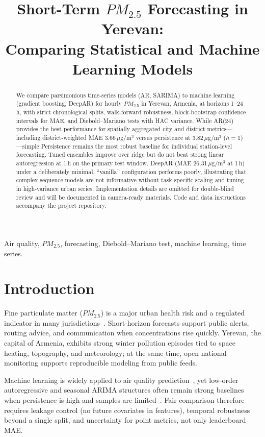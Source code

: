 \documentclass[conference]{IEEEtran}
\title{Short-Term $PM_{2.5}$ Forecasting in Yerevan:\\
Comparing Statistical and Machine Learning Models}
\author{%
\IEEEauthorblockN{Anonymous author(s)}%
\IEEEauthorblockA{%
\textit{Author identities withheld for double-blind review (ICDSG 2026)}%
}%
}
\author{%
\IEEEauthorblockN{Areg Khachatryan}%
\IEEEauthorblockA{%
American University of Armenia\\
Yerevan, Armenia}%
}
\begin{document}
\maketitle
\begin{abstract}
We compare parsimonious time-series models (AR, SARIMA) to machine learning (gradient boosting, DeepAR) for hourly $PM_{2.5}$ in Yerevan, Armenia, at horizons 1--24\,h, with strict chronological splits, walk-forward robustness, block-bootstrap confidence intervals for MAE, and Diebold--Mariano tests with HAC variance. While AR(24) provides the best performance for spatially aggregated city and district metrics---including district-weighted MAE 3.66\,$\mu$g/m$^3$ versus persistence at 3.82\,$\mu$g/m$^3$ ($h{=}1$)---simple Persistence remains the most robust baseline for individual station-level forecasting. Tuned ensembles improve over ridge but do not beat strong linear autoregression at 1\,h on the primary test window. DeepAR (MAE 26.31\,$\mu$g/m$^3$ at 1\,h) under a deliberately minimal, ``vanilla'' configuration performs poorly, illustrating that complex sequence models are not informative without task-specific scaling and tuning in high-variance urban series.
\ificdsgreview
Implementation details are omitted for double-blind review and will be documented in camera-ready materials.
\else
Code and data instructions accompany the project repository.
\fi
\end{abstract}

\begin{IEEEkeywords}
Air quality, $PM_{2.5}$, forecasting, Diebold--Mariano test, machine learning, time series.
\end{IEEEkeywords}

\section{Introduction}

Fine particulate matter ($PM_{2.5}$) is a major urban health risk and a regulated indicator in many jurisdictions~\cite{world2021who}. Short-horizon forecasts support public alerts, routing advice, and communication when concentrations rise quickly. Yerevan, the capital of Armenia, exhibits strong winter pollution episodes tied to space heating, topography, and meteorology; at the same time, open national monitoring supports reproducible modeling from public feeds.

Machine learning is widely applied to air quality prediction~\cite{shao2020predictions}, yet low-order autoregressive and seasonal ARIMA structures often remain strong baselines when persistence is high and samples are limited~\cite{box2015time,hyndman2021forecasting}. Fair comparison therefore requires leakage control (no future covariates in features), temporal robustness beyond a single split, and uncertainty for point metrics, not only leaderboard MAE.
\end{document}
